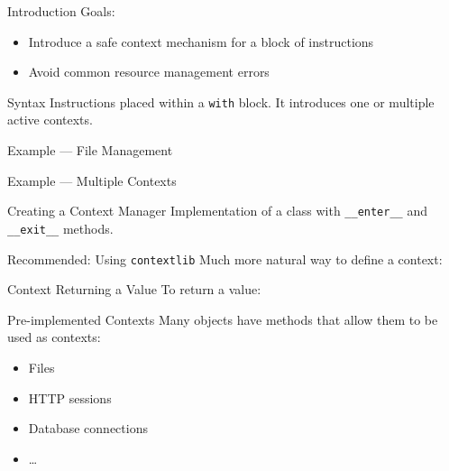 \begin{frame}{Introduction}
  Goals:
  \begin{itemize}[<+->]
    \item Introduce a safe context mechanism for a block of instructions
    \item Avoid common resource management errors
  \end{itemize}
\end{frame}

\begin{frame}{Syntax}
  Instructions placed within a \texttt{with} block. It introduces one or multiple active contexts.
\end{frame}

\begin{frame}{Example --- File Management}
\end{frame}

\begin{frame}{Example --- Multiple Contexts}
\end{frame}

\begin{frame}{Creating a Context Manager}
  Implementation of a class with \texttt{\_\_enter\_\_} and \texttt{\_\_exit\_\_} methods.

\end{frame}

\begin{frame}{Recommended: Using \texttt{contextlib}}
  Much more natural way to define a context:

\end{frame}

\begin{frame}{Context Returning a Value}
  To return a value:

\end{frame}

\begin{frame}{Pre-implemented Contexts}
  Many objects have methods that allow them to be used as contexts:
  \begin{itemize}[<+->]
    \item Files
    \item HTTP sessions
    \item Database connections
    \item \dots
  \end{itemize}
\end{frame}

